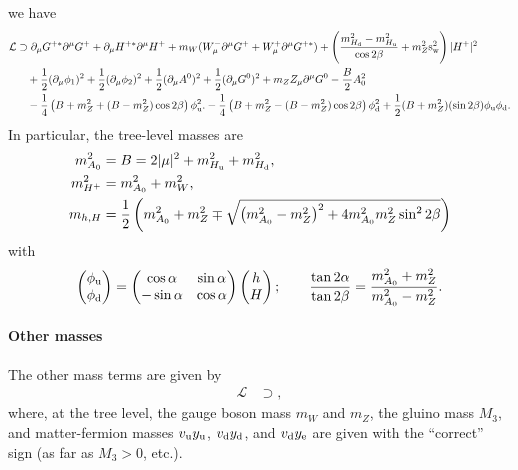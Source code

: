 \documentclass[CheatSheet]{subfiles}
\begin{document}
we have
\begin{equation}
\begin{split}
  \mathcal L &\supset
\partial_\mu G^{+*}\partial^\mu G^+
+\partial_\mu H^{+*}\partial^\mu H^+
+m_W(W^-_\mu\partial^\mu G^+ + W^+_\mu\partial^\mu G^{+*})
+ \left(\frac{m_{H_{\mathrm{d}}}^2-m_{H_{\mathrm{u}}}^2}{\cos2\beta} + m_Z^2\mathrm{s}_{\mathrm w}^2\right)|H^+|^2
\\&\quad
+\frac12(\partial_\mu\phi_1)^2
+\frac12(\partial_\mu\phi_2)^2
+\frac12(\partial_\mu A^0)^2
+\frac12(\partial_\mu G^0)^2
+m_Z Z_\mu\partial^\mu G^0
-\frac{B}{2}A_0^2
\\&\quad
-\frac14\left(B+m_Z^2+(B-m_Z^2)\cos2\beta\right)\phi_{\mathrm{u}}^2.
-\frac14\left(B+m_Z^2-(B-m_Z^2)\cos2\beta\right)\phi_{\mathrm{d}}^2
+\frac12(B+m_Z^2)(\sin 2\beta)\phi_{\mathrm{u}}\phi_{\mathrm{d}}.
\end{split}
\end{equation}
In particular, the tree-level masses are
\begin{align}
 m_{A_0}^2 &= B = 2|\mu|^2+m_{H_{\mathrm{u}}}^2+m_{H_{\mathrm{d}}}^2,
\\
 m_{H^+}^2 &= m_{A_0}^2 + m_W^2,\\
 m_{h,H} &= \frac12\left(m_{A_0}^2 + m_Z^2 \mp \sqrt{\left(m_{A_0}^2-m_Z^2\right)^2+4m_{A_0}^2m_Z^2\sin^22\beta}\right)
\end{align}
with
\begin{equation}
 \begin{pmatrix}\phi_{\mathrm{u}}\\\phi_{\mathrm{d}}\end{pmatrix} = \begin{pmatrix}\cos\alpha & \sin\alpha \\ -\sin\alpha&\cos\alpha\end{pmatrix}\begin{pmatrix}h\\H\end{pmatrix};
\qquad
\frac{\tan2\alpha}{\tan2\beta} = \frac{m_{A_0}^2+m_Z^2}{m_{A_0}^2-m_Z^2}.
\end{equation}

\paragraph{Other masses}
The other mass terms are given by
\begin{equation}
 \begin{split}
\mathcal L&\supset
   ,
 \end{split}
\end{equation}
where, at the tree level, the gauge boson mass $m_W$ and $m_Z$, the gluino mass $M_3$, and matter-fermion masses $v_{\mathrm{u}}y_{\mathrm{u}}$, $v_{\mathrm{d}}y_{\mathrm{d}}$, and $v_{\mathrm{d}}y_{\mathrm{e}}$ are given with the ``correct'' sign (as far as $M_3>0$, etc.).
\end{document}

